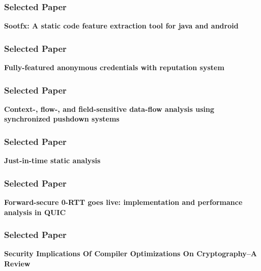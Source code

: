 \documentclass[handout]{beamer}
\begin{document}
\begin{frame}[plain]
\centering
\frametitle{Selected Paper}
\Large\textbf{Sootfx: A static code feature extraction tool for java and android}
\end{frame}
\begin{frame}[plain]
\centering
\frametitle{Selected Paper}
\Large\textbf{Fully-featured anonymous credentials with reputation system}
\end{frame}
\begin{frame}[plain]
\centering
\frametitle{Selected Paper}
\Large\textbf{Context-, flow-, and field-sensitive data-flow analysis using synchronized pushdown systems}
\end{frame}
\begin{frame}[plain]
\centering
\frametitle{Selected Paper}
\Large\textbf{Just-in-time static analysis}
\end{frame}
\begin{frame}[plain]
\centering
\frametitle{Selected Paper}
\Large\textbf{Forward-secure 0-RTT goes live: implementation and performance analysis in QUIC}
\end{frame}
\begin{frame}[plain]
\centering
\frametitle{Selected Paper}
\Large\textbf{Security Implications Of Compiler Optimizations On Cryptography--A Review}
\end{frame}
\end{document}
